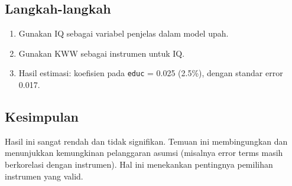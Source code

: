 \documentclass[]{article}
\begin{document}
\subsection*{Langkah-langkah}
\begin{enumerate}
    \item Gunakan IQ sebagai variabel penjelas dalam model upah.
    \item Gunakan KWW sebagai instrumen untuk IQ.
    \item Hasil estimasi: koefisien pada \texttt{educ} = 0.025 (2.5\%), dengan standar error 0.017.
\end{enumerate}

\subsection*{Kesimpulan}
Hasil ini sangat rendah dan tidak signifikan. 
Temuan ini membingungkan dan menunjukkan kemungkinan pelanggaran asumsi (misalnya error terms masih berkorelasi dengan instrumen).
Hal ini menekankan pentingnya pemilihan instrumen yang valid.
\newline
\end{document}
